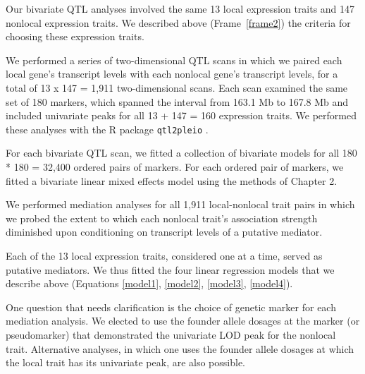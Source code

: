 \documentclass[oneside]{book}\usepackage[]{graphicx}\usepackage[]{color}
\begin{document}
\begin{titlepage}

Our bivariate QTL analyses involved the same 13 local expression traits and 147 nonlocal expression traits.
We described above (Frame~\ref{frame2}) the criteria for choosing these expression traits.

We performed a series of two-dimensional QTL scans in which we paired each local gene's
transcript levels with each nonlocal gene's transcript levels,
for a total of 13 x 147 = 1,911 two-dimensional scans.
Each scan examined the same set of 180 markers, which spanned the interval from 163.1 Mb to 167.8 Mb and included univariate peaks for all 13 + 147 = 160 expression traits.
We performed these analyses with the R package \texttt{qtl2pleio} \citep{qtl2pleio}.

For each bivariate QTL scan, we fitted a collection of bivariate models for
all 180 * 180 = 32,400 ordered pairs of markers.
For each ordered pair of markers, we fitted a bivariate linear mixed
effects model using the methods of Chapter 2.


We performed mediation analyses for
all 1,911 local-nonlocal trait pairs in which
we probed the extent to which each nonlocal trait's association
strength diminished upon conditioning on transcript levels of a putative mediator.

Each of the 13 local expression traits, considered one at a time, served as putative mediators.
We thus fitted the four linear regression models that we describe
above (Equations \ref{model1}, \ref{model2}, \ref{model3}, \ref{model4}).

One question that needs clarification is the choice of genetic marker
for each mediation analysis.
We elected to use the founder allele dosages at the marker (or pseudomarker) that demonstrated the
univariate LOD peak for the nonlocal trait.
Alternative analyses, in which one uses the founder allele dosages at which the
local trait has its univariate peak, are also possible.





\end{titlepage}
\end{document}
